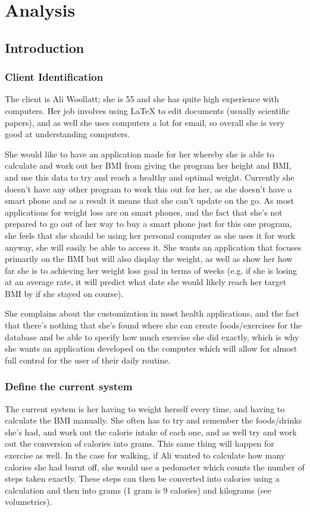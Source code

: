 \chapter{Analysis}

\section{Introduction}

\subsection{Client Identification}
The client is Ali Woollatt; she is 55 and she has quite high experience with computers. Her job involves using LaTeX to edit documents (usually scientific papers), and as well she uses computers a lot for email, so overall she is very good at understanding computers.

She would like to have an application made for her whereby she is able to calculate and work out her BMI from giving the program her height and BMI, and use this data to try and reach a healthy and optimal weight. Currently she doesn't have any other program to work this out for her, as she doesn't have a smart phone and as a result it means that she can't update on the go. As most applications for weight loss are on smart phones, and the fact that she's not prepared to go out of her way to buy a smart phone just for this one program, she feels that she should be using her personal computer as she uses it for work anyway, she will easily be able to access it. She wants an application that focuses primarily on the BMI but will also display the weight, as well as show her how far she is to achieving her weight loss goal in terms of weeks (e.g. if she is losing at an average rate, it will predict what date she would likely reach her target BMI by if she stayed on course).

She complains about the customization in most health applications, and the fact that there's nothing that she's found where she can create foods/exercises for the database and be able to specify how much exercise she did exactly, which is why she wants an application developed on the computer which will allow for almost full control for the user of their daily routine.

\subsection{Define the current system}
The current system is her having to weight herself every time, and having to calculate the BMI manually. She often has to try and remember the foods/drinks she's had, and work out the calorie intake of each one, and as well try and work out the conversion of calories into grams. This same thing will happen for exercise as well. In the case for walking, if Ali wanted to calculate how many calories she had burnt off, she would use a pedometer which counts the number of steps taken exactly. These steps can then be converted into calories using a calculation and then into grams (1 gram is 9 calories) and kilograms (see volumetrics).

